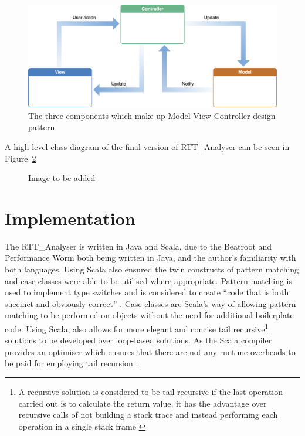 \documentclass[a4paper, 11pt]{article}
\begin{document}
\begin{figure}[ht]
	\centering
	\includegraphics[scale=0.25]{images/mvc.png}
	\caption{The three components which make up Model View Controller design pattern \cite{applemvc}}
	\label{fig: mvc}
\end{figure}

A high level class diagram of the final version of RTT\_Analyser can be seen in Figure~\ref{fig: uml} 

\begin{figure}
	\centering
	\caption{Image to be added}
	\label{fig: uml}
\end{figure}


\maketitle{} \section{Implementation}
The RTT\_Analyser is written in Java and Scala, due to the Beatroot and Performance Worm both being written in Java, and the author's familiarity with both languages. Using Scala also ensured the twin constructs of pattern matching and case classes were able to be utilised where appropriate. Pattern matching is used to implement type switches and is considered to create ``code that is both succinct and obviously correct'' \cite{mariusEr}. Case classes are Scala's way of allowing pattern matching to be performed on objects without the need for additional boilerplate code. Using Scala, also allows for more elegant and concise tail recursive\footnote{A recursive solution is considered to be tail recursive if the last operation carried out is to calculate the return value, it has the advantage over recursive calls of not building a stack trace and instead performing each operation in a single stack frame \cite{odesky}} solutions to be developed over loop-based solutions. As the Scala compiler provides an optimiser which ensures that there are not any runtime overheads to be paid for employing tail recursion \cite{odesky}.
\end{document}

